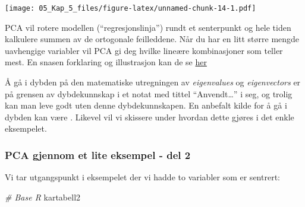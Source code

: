 \documentclass[
]{article}
\newenvironment{Shaded}{\begin{snugshade}}{\end{snugshade}}
\newcommand{\CommentTok}[1]{\textcolor[rgb]{0.56,0.35,0.01}{\textit{#1}}}
\newcommand{\NormalTok}[1]{#1}
\begin{document}
\texttt{[image: 05\_Kap\_5\_files/figure-latex/unnamed-chunk-14-1.pdf]}

PCA vil rotere modellen (``regresjonslinja'') rundt et senterpunkt og hele tiden kalkulere summen av de ortogonale feilleddene. Når du har en litt større mengde uavhengige variabler vil PCA gi deg hvilke lineære kombinasjoner som teller mest. En snasen forklaring og illustrasjon kan de se \href{https://stats.stackexchange.com/questions/2691/making-sense-of-principal-component-analysis-eigenvectors-eigenvalues/2700\#2700}{her}

Å gå i dybden på den matematiske utregningen av \emph{eigenvalues} og \emph{eigenvectors} er på grensen av dybdekunnskap i et notat med tittel ``Anvendt\ldots{}'' i seg, og trolig kan man leve godt uten denne dybdekunnskapen. En anbefalt kilde for å gå i dybden kan være \citet{smithTutorialPrincipalComponents2002}. Likevel vil vi skissere under hvordan dette gjøres i det enkle eksempelet.

\hypertarget{pca-gjennom-et-lite-eksempel---del-2}{%
\subsubsection{PCA gjennom et lite eksempel - del 2}\label{pca-gjennom-et-lite-eksempel---del-2}}

Vi tar utgangspunkt i eksempelet der vi hadde to variabler som er sentrert:

\begin{Shaded}
\begin{Highlighting}[]
\CommentTok{\# Base R}
\NormalTok{kartabell2}
\end{Highlighting}
\end{Shaded}

\providecommand{\docline}[3]{\noalign{\global\setlength{\arrayrulewidth}{#1}}\arrayrulecolor[HTML]{#2}\cline{#3}}

\setlength{\tabcolsep}{2pt}

\renewcommand*{\arraystretch}{1.5}
\end{document}
